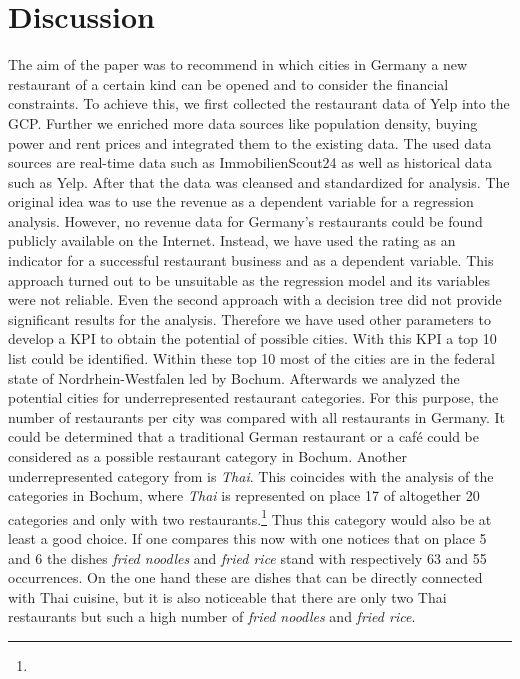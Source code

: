 \section{Discussion}
\label{sec:discussion}
The aim of the paper was to recommend in which cities in Germany a new restaurant of a certain kind can be opened and to consider the financial constraints. To achieve this, we first collected the restaurant data of Yelp into the \ac{GCP}. Further we enriched more data sources like population density, buying power and rent prices and integrated them to the existing data. The used data sources are real-time data such as ImmobilienScout24 as well as historical data such as Yelp. After that the data was cleansed and standardized for analysis. The original idea was to use the revenue as a dependent variable for a regression analysis. However, no revenue data for Germany's restaurants could be found publicly available on the Internet. Instead, we have used the rating as an indicator for a successful restaurant business and as a dependent variable. This approach turned out to be unsuitable as the regression model and its variables were not reliable. Even the second approach with a decision tree did not provide significant results for the analysis. Therefore we have used other parameters to develop a \ac{KPI} to obtain the potential of possible cities. With this \ac{KPI} a top 10 list could be identified. Within these top 10 most of the cities are in the federal state of Nordrhein-Westfalen led by Bochum. Afterwards we analyzed the potential cities for underrepresented restaurant categories. For this purpose, the number of restaurants per city was compared with all restaurants in Germany. 
It could be determined that a traditional German restaurant or a café could be considered as a possible restaurant category in Bochum. Another underrepresented category from  is \textit{Thai}. This coincides with the analysis of the categories in Bochum, where \textit{Thai} is represented on place 17 of altogether 20 categories and only with two restaurants.\footnote{} Thus this category would also be at least a good choice. If one compares this now with  one notices that on place 5 and 6 the dishes \textit{fried noodles} and \textit{fried rice} stand with respectively 63 and 55 occurrences. On the one hand these are dishes that can be directly connected with Thai cuisine, but it is also noticeable that there are only two Thai restaurants but such a high number of \textit{fried noodles} and \textit{fried rice}.
